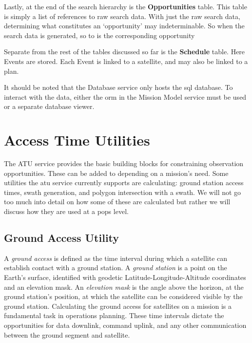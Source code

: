 Lastly, at the end of the search hierarchy is the \textbf{Opportunities} table.
This table is simply a list of references to raw search data. With just the raw
search data, determining what constitutes an `opportunity' may indeterminable.
So when the search data is generated, so to is the corresponding opportunity

Separate from the rest of the tables discussed so far is the \textbf{Schedule}
table. Here Events are stored. Each Event is linked to a satellite, and may
also be linked to a plan.

It should be noted that the Database service only hosts the \gls{sql} database.
To interact with the data, either the \acrshort{orm} in the Mission Model
service must be used or a separate database viewer.




\section{Access Time Utilities}\label{sec:atu}

The ATU service provides the basic building blocks for
constraining observation opportunities. These can be added to depending on a
mission’s need. Some utilities the \gls{atu} service currently supports are
calculating: ground station access times, swath generation, and polygon
intersection with a swath. We will not go too much into detail on how some of
these are calculated but rather we will discuss how they are used at a
\gls{pops} level.

\subsection{Ground Access Utility}

A \textit{ground access} is defined as the time interval during which a
satellite can establish contact with a ground station. A \textit{ground
station} is a point on the Earth’s surface, identified with geodetic
Latitude-Longitude-Altitude coordinates and an elevation mask. An
\textit{elevation mask} is the angle above the horizon, at the ground station’s
position, at which the satellite can be considered visible by the ground
station. Calculating the ground access for satellites on a mission is a
fundamental task in operations planning. These time intervals dictate the
opportunities for data downlink, command uplink, and any other communication
between the ground segment and satellite.

